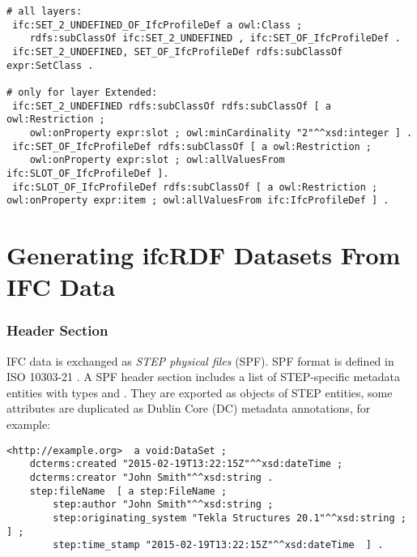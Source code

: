 
\begin{lstlisting}
# all layers:
 ifc:SET_2_UNDEFINED_OF_IfcProfileDef a owl:Class ;
    rdfs:subClassOf ifc:SET_2_UNDEFINED , ifc:SET_OF_IfcProfileDef .
 ifc:SET_2_UNDEFINED, SET_OF_IfcProfileDef rdfs:subClassOf expr:SetClass .

# only for layer Extended:
 ifc:SET_2_UNDEFINED rdfs:subClassOf rdfs:subClassOf [ a owl:Restriction ;
    owl:onProperty expr:slot ; owl:minCardinality "2"^^xsd:integer ] .
 ifc:SET_OF_IfcProfileDef rdfs:subClassOf [ a owl:Restriction ;
    owl:onProperty expr:slot ; owl:allValuesFrom ifc:SLOT_OF_IfcProfileDef ].
 ifc:SLOT_OF_IfcProfileDef rdfs:subClassOf [ a owl:Restriction ; owl:onProperty expr:item ; owl:allValuesFrom ifc:IfcProfileDef ] .
\end{lstlisting}



\section{Generating ifcRDF Datasets From IFC Data}
\label{sec:ifcRDF}

\subsubsection{Header Section} IFC data is exchanged as \emph{STEP physical files} (SPF). SPF format is defined in ISO 10303-21 \cite{ISO10303-21}. A SPF header section includes a list of STEP-specific metadata entities with types   and . %
They are exported as objects of STEP entities, some attributes are duplicated as Dublin Core (DC) metadata annotations, for example:

\begin{lstlisting}
<http://example.org>  a void:DataSet ;
    dcterms:created "2015-02-19T13:22:15Z"^^xsd:dateTime ;
    dcterms:creator "John Smith"^^xsd:string .
    step:fileName  [ a step:FileName ;
        step:author "John Smith"^^xsd:string ;
        step:originating_system "Tekla Structures 20.1"^^xsd:string ; ] ;
        step:time_stamp "2015-02-19T13:22:15Z"^^xsd:dateTime  ] .
\end{lstlisting}


